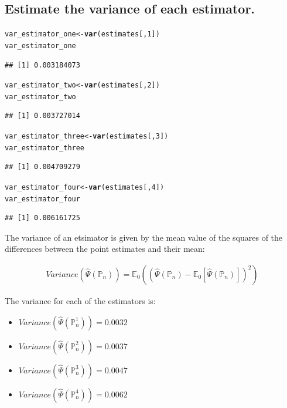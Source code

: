 \documentclass{article}\usepackage[]{graphicx}\usepackage[]{xcolor}
\makeatletter
\newcommand{\hlnum}[1]{\textcolor[rgb]{0.686,0.059,0.569}{#1}}%
\newcommand{\hlstd}[1]{\textcolor[rgb]{0.345,0.345,0.345}{#1}}%
\newcommand{\hlkwb}[1]{\textcolor[rgb]{0.69,0.353,0.396}{#1}}%
\newcommand{\hlkwd}[1]{\textcolor[rgb]{0.737,0.353,0.396}{\textbf{#1}}}%
\newenvironment{kframe}{%
 \def\at@end@of@kframe{}%
 \ifinner\ifhmode%
  \def\at@end@of@kframe{\end{minipage}}%
  \begin{minipage}{\columnwidth}%
 \fi\fi%
 \def\FrameCommand##1{\hskip\@totalleftmargin \hskip-\fboxsep
 \colorbox{shadecolor}{##1}\hskip-\fboxsep
     \hskip-\linewidth \hskip-\@totalleftmargin \hskip\columnwidth}%
 \MakeFramed {\advance\hsize-\width
   \@totalleftmargin\z@ \linewidth\hsize
   \@setminipage}}%
 {\par\unskip\endMakeFramed%
 \at@end@of@kframe}
\newenvironment{knitrout}{}{} %
\makeatother
\begin{document}
  
  \subsection{Estimate the variance of each estimator.}
  
\begin{knitrout}
\color{fgcolor}\begin{kframe}
\begin{alltt}
\hlstd{var_estimator_one} \hlkwb{<-} \hlkwd{var}\hlstd{(estimates[,}\hlnum{1}\hlstd{])}
\hlstd{var_estimator_one}
\end{alltt}
\begin{verbatim}
## [1] 0.003184073
\end{verbatim}
\begin{alltt}
\hlstd{var_estimator_two} \hlkwb{<-} \hlkwd{var}\hlstd{(estimates[,}\hlnum{2}\hlstd{])}
\hlstd{var_estimator_two}
\end{alltt}
\begin{verbatim}
## [1] 0.003727014
\end{verbatim}
\begin{alltt}
\hlstd{var_estimator_three} \hlkwb{<-} \hlkwd{var}\hlstd{(estimates[,}\hlnum{3}\hlstd{])}
\hlstd{var_estimator_three}
\end{alltt}
\begin{verbatim}
## [1] 0.004709279
\end{verbatim}
\begin{alltt}
\hlstd{var_estimator_four} \hlkwb{<-} \hlkwd{var}\hlstd{(estimates[,}\hlnum{4}\hlstd{])}
\hlstd{var_estimator_four}
\end{alltt}
\begin{verbatim}
## [1] 0.006161725
\end{verbatim}
\end{kframe}
\end{knitrout}
  
The variance of an etsimator is given by the mean value of the squares of the differences between the point estimates and their mean:

\begin{align*}
Variance(\hat{\Psi}(\mathbb{P}_n))=\mathbb{E}_0((\hat{\Psi}(\mathbb{P}_n)-\mathbb{E}_0[\hat{\Psi}(\mathbb{P}_n)])^2)
\end{align*}

The variance for each of the estimators is:

\begin{itemize}

  \item $Variance(\hat{\Psi}(\mathbb{P}_n^1))=0.0032$
  \item $Variance(\hat{\Psi}(\mathbb{P}_n^2))=0.0037$
  \item $Variance(\hat{\Psi}(\mathbb{P}_n^3))=0.0047$
  \item $Variance(\hat{\Psi}(\mathbb{P}_n^4))=0.0062$

\end{itemize}
\end{document}
